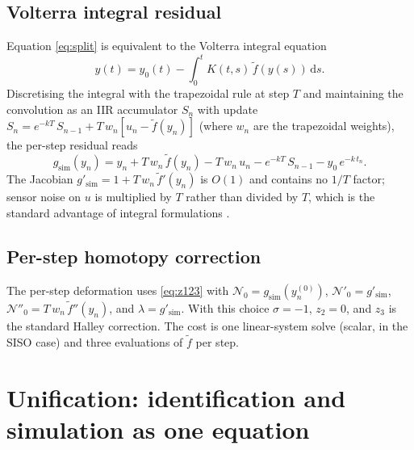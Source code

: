 \documentclass[preprint,12pt,numbers]{elsarticle}
\begin{document}
\subsection{Volterra integral residual}

Equation \eqref{eq:split} is equivalent to the Volterra integral equation
\begin{equation}
y(t) = y_0(t) - \int_0^t K(t,s)\,\tilde{f}(y(s))\,\mathrm{d}s.
\label{eq:volterra}
\end{equation}
Discretising the integral with the trapezoidal rule at step $T$ and
maintaining the convolution as an IIR accumulator $S_n$ with update
$S_n = e^{-kT}\,S_{n-1} + T\,w_n[u_n - \tilde{f}(y_n)]$ (where $w_n$ are
the trapezoidal weights), the per-step residual reads
\begin{equation}
g_{\mathrm{sim}}(y_n) = y_n + T\,w_n\,\tilde{f}(y_n)
- T\,w_n\,u_n
- e^{-kT}\,S_{n-1} - y_0\,e^{-k\,t_n}.
\label{eq:g-sim}
\end{equation}
The Jacobian $g'_{\mathrm{sim}} = 1 + T\,w_n\,\tilde{f}'(y_n)$ is $O(1)$
and contains no $1/T$ factor; sensor noise on $u$ is multiplied by $T$
rather than divided by $T$, which is the standard advantage of integral
formulations \cite{Atkinson1997,Kress2014}.

\subsection{Per-step homotopy correction}

The per-step deformation uses \eqref{eq:z123} with $\mathcal{N}_0 = g_{\mathrm{sim}}(y_n^{(0)})$,
$\mathcal{N}'_0 = g'_{\mathrm{sim}}$, $\mathcal{N}''_0 = T\,w_n\,\tilde{f}''(y_n)$,
and $\lambda = g'_{\mathrm{sim}}$. With this choice $\sigma = -1$,
$z_2 = 0$, and $z_3$ is the standard Halley correction. The cost is one
linear-system solve (scalar, in the SISO case) and three evaluations of
$\tilde{f}$ per step.


\section{Unification: identification and simulation as one equation}
\label{sec:unification}
\end{document}
